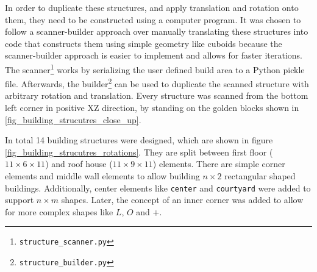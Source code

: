 \documentclass[
oneside,
fontsize=11pt
]{scrartcl}
\begin{document}
In order to duplicate these structures, and apply translation and rotation onto them,
they need to be constructed using a computer program.
It was chosen to follow a scanner-builder approach over 
manually translating these structures into code that constructs them using 
simple geometry like cuboids 
because the scanner-builder approach is easier to implement 
and allows for faster iterations.
The scanner\footnote{\texttt{structure\_scanner.py}} works by 
serializing the user defined build area to a Python pickle file. 
Afterwards, the builder\footnote{\texttt{structure\_builder.py}} 
can be used to duplicate the scanned structure with arbitrary rotation and translation.
Every structure was scanned from the bottom left corner in positive XZ direction, 
by standing on the golden blocks shown in \autoref{fig_building_strucutres_close_up}.

In total 14 building structures were designed, which are shown in figure \autoref{fig_building_strucutres_rotations}.
They are split between first floor ($11 \times 6 \times 11$) and roof house ($11 \times 9 \times 11$) elements.
There are simple corner elements and middle wall elements to allow building $n \times 2$
rectangular shaped buildings.
Additionally, center elements like \texttt{center} and \texttt{courtyard} were added to 
support $n \times m$ shapes. 
Later, the concept of an inner corner was added to allow for more complex shapes like  
$L$, $O$ and $+$.
\end{document}
